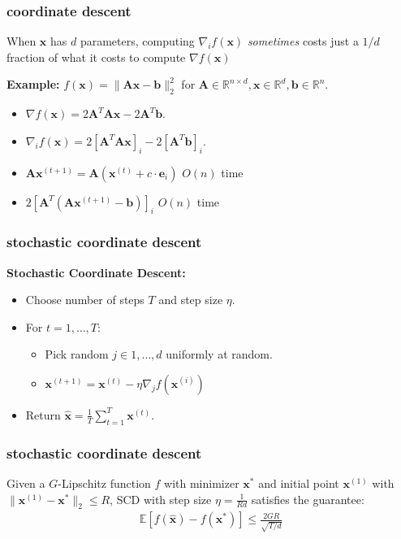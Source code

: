 \documentclass[compress]{beamer}
\newcommand{\bv}[1]{\mathbf{#1}}
\newcommand{\R}{\mathbb{R}}
\newcommand{\E}{\mathbb{E}}
\begin{document}
\begin{frame}[t]
	\frametitle{coordinate descent}
	When $\bv{x}$ has $d$ parameters, computing $\nabla_i f(\bv{x})$ \emph{sometimes} costs just a $1/d$ fraction of what it costs to compute $\nabla f(\bv{x})$ 
	
	\vspace{1em}
	\textbf{Example:} $f(\bv{x}) = \|\bv{A}\bv{x} - \bv{b}\|_2^2$ for $\bv{A} \in \R^{n\times d}, \bv{x} \in \R^{d}, \bv{b} \in \R^n$. 
	\begin{itemize}
		\item $\nabla f(\bv{x}) = 2\bv{A}^T\bv{A}\bv{x} - 2\bv{A}^T\bv{b}$.
		\item $\nabla_i f(\bv{x}) = 2\left[\bv{A}^T\bv{A}\bv{x}\right]_i - 2\left[\bv{A}^T\bv{b}\right]_i$.
	\end{itemize}
	
	\vspace{2em}
	\begin{itemize}
		\item $\bv{A}\bv{x}^{(t+1)} = \bv{A}\left(\bv{x}^{(t)} + c\cdot \bv{e}_i\right)$ \hspace{4em} \alert{$O(n)$ time}
		\item $2\left[\bv{A}^T \left(\bv{A}\bv{x}^{(t+1)} - \bv{b}\right)\right]_i$ \hspace{6em} \alert{$O(n)$ time}
	\end{itemize}
\end{frame}

\begin{frame}[t]
	\frametitle{stochastic coordinate descent}	
	\textbf{Stochastic Coordinate Descent:}
	\begin{itemize}
		\item Choose number of steps $T$ and step size $\eta$.
		\item For $t = 1,\ldots, T$:
		\begin{itemize}
			\item Pick random $j \in 1, \ldots, d$ uniformly at random.
			\item $\bv{x}^{(t+1)} = \bv{x}^{(t)} - \eta \nabla_{j} f(\bv{x}^{(i)})$
		\end{itemize}
		\item Return $\hat{\bv{x}} = \frac{1}{T}\sum_{t=1}^T \bv{x}^{(t)}$.
	\end{itemize}
\end{frame}

\begin{frame}[t]
	\frametitle{stochastic coordinate descent}
	\begin{theorem}
		Given a $G$-Lipschitz function $f$ with minimizer $\bv{x}^*$ and initial point $\bv{x}^{(1)} $ with $\|\bv{x}^{(1)} - \bv{x}^*\|_2 \leq R$, SCD with step size $\eta = \frac{1}{Rd}$ satisfies the guarantee:
		\begin{align*}
		\E[f(\hat{\bv{x}}) - f({\bv{x}^*})] \leq \frac{2GR}{\sqrt{T/d}}
		\end{align*}
	\end{theorem}
\end{frame}
\end{document}

